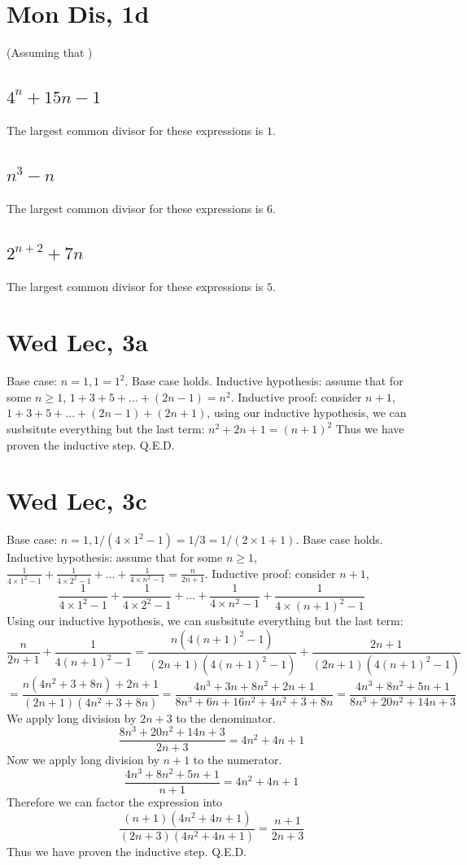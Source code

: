 \documentclass[12pt]{article}
\begin{document}
\section{Mon Dis, 1d}
(Assuming that )
\subsection{$4^n + 15n -1$}
The largest common divisor for these expressions is $1$.

\subsection{$n^3 - n$}
The largest common divisor for these expressions is $6$.

\subsection{$2^{n+2} + 7n$}
The largest common divisor for these expressions is $5$.
\newpage


\section{Wed Lec, 3a}
Base case: $n = 1, 1 = 1^2$. Base case holds.
\newline
Inductive hypothesis: assume that for some $n \geq 1$, $1+ 3 + 5 + ... + (2n-1) = n^2$.
\newline
Inductive proof: consider $n+1$, $1+ 3 + 5 + ... + (2n-1) + (2n+1)$, using our inductive hypothesis, we can susbsitute everything but the last term: $n^2 + 2n + 1 = (n+1)^2$
\newline
Thus we have proven the inductive step. Q.E.D.

\section{Wed Lec, 3c}
Base case: $n = 1, 1/(4 \times 1^2 - 1) = 1/3 = 1/(2 \times 1 + 1)$. Base case holds.
\newline
Inductive hypothesis: assume that for some $n \geq 1$, $\frac{1}{4 \times 1^2 - 1} + \frac{1}{4 \times 2^2 - 1} + ... + \frac{1}{4 \times n^2 - 1} = \frac{n}{2n+1}$.
\newline
Inductive proof: consider $n+1$, $$\frac{1}{4 \times 1^2 - 1} + \frac{1}{4 \times 2^2 - 1} + ... + \frac{1}{4 \times n^2 - 1} + \frac{1}{4 \times (n+1)^2 - 1}$$
Using our inductive hypothesis, we can susbsitute everything but the last term: $$\frac{n}{2n+1} + \frac{1}{4(n+1)^2 - 1} = \frac{n (4(n+1)^2-1)}{(2n+1)(4(n+1)^2-1)} + \frac{2n+1}{(2n+1)(4(n+1)^2 - 1)}$$
$$=\frac{n(4n^2+3+8n) + 2n +1}{(2n+1)(4n^2+3+8n)} = \frac{4n^3+3n+8n^2+2n+1}{8n^3+6n+16n^2+4n^2+3+8n}=\frac{4n^3+8n^2+5n+1}{8n^3+20n^2+14n+3}$$
We apply long division by $2n+3$ to the denominator.
$$\frac{8n^3+20n^2+14n+3}{2n+3} = 4n^2 + 4n + 1$$
Now we apply long division by $n+1$ to the numerator.
$$\frac{4n^3+8n^2+5n+1}{n+1} =  4n^2 + 4n + 1$$
Therefore we can factor the expression into
$$\frac{(n+1)(4n^2 + 4n + 1)}{(2n+3)(4n^2 + 4n + 1)} = \frac{n+1}{2n+3}$$
\newline
Thus we have proven the inductive step. Q.E.D.
\end{document}
